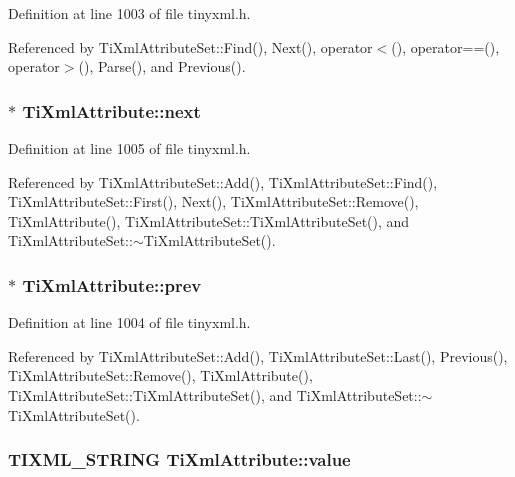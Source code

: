 Definition at line 1003 of file tinyxml.h.

Referenced by TiXmlAttributeSet::Find(), Next(), operator$<$(), operator==(), operator$>$(), Parse(), and Previous().\hypertarget{class_ti_xml_attribute_ae851adf61b80cf45b797fee77dea135f}{
\subsubsection[{next}]{$\ast$ {\bf TiXmlAttribute::next}}}
\label{class_ti_xml_attribute_ae851adf61b80cf45b797fee77dea135f}


Definition at line 1005 of file tinyxml.h.

Referenced by TiXmlAttributeSet::Add(), TiXmlAttributeSet::Find(), TiXmlAttributeSet::First(), Next(), TiXmlAttributeSet::Remove(), TiXmlAttribute(), TiXmlAttributeSet::TiXmlAttributeSet(), and TiXmlAttributeSet::$\sim$TiXmlAttributeSet().\hypertarget{class_ti_xml_attribute_aaf6c6272c625fbf38e571cbf570ea94a}{
\subsubsection[{prev}]{$\ast$ {\bf TiXmlAttribute::prev}}}
\label{class_ti_xml_attribute_aaf6c6272c625fbf38e571cbf570ea94a}


Definition at line 1004 of file tinyxml.h.

Referenced by TiXmlAttributeSet::Add(), TiXmlAttributeSet::Last(), Previous(), TiXmlAttributeSet::Remove(), TiXmlAttribute(), TiXmlAttributeSet::TiXmlAttributeSet(), and TiXmlAttributeSet::$\sim$TiXmlAttributeSet().\hypertarget{class_ti_xml_attribute_ae9e4e5f442347434b1da43954cc1b411}{
\subsubsection[{value}]{\setlength{\rightskip}{0pt plus 5cm}TIXML\_\-STRING {\bf TiXmlAttribute::value}}}
\label{class_ti_xml_attribute_ae9e4e5f442347434b1da43954cc1b411}


